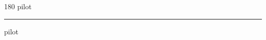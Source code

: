 
\begin{frame}
\begin{center}
\begin{turn}{180}
{\fontsize{2.5cm}{1em}\selectfont pilot}
\end{turn}
\vspace{1em}\par  
\hrule
\vspace{1em}\par  
{\fontsize{2.5cm}{1em}\selectfont pilot}
\end{center}
\end{frame}

